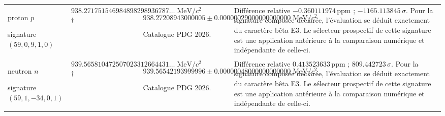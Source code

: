 \begin{longtable}{@{}>{\raggedright\arraybackslash}p{}>{\raggedright\arraybackslash}p{}>{\raggedright\arraybackslash}p{}>{\raggedright\arraybackslash}p{}@{}}
proton $p$\par signature $(59,\allowbreak 0,\allowbreak 9,\allowbreak 1,\allowbreak 0)$ & $938.271751\allowbreak{}546984\allowbreak{}898298\allowbreak{}936787\ldots\;\mathrm{MeV}/c^2$\textsuperscript{\(\dagger\)} & $938.272089\allowbreak{}430000\allowbreak{}05\pm 0.000000\allowbreak{}290000\allowbreak{}000000\allowbreak{}00\;\mathrm{MeV}/c^2$\par\footnotesize Catalogue PDG 2026. & Différence relative $-0.360111\allowbreak{}974\,\mathrm{ppm}$ ; $-1165.113845\,\sigma$. Pour la signature composée déclarée, l’évaluation se déduit exactement du caractère bêta E3. Le sélecteur prospectif de cette signature est une application antérieure à la comparaison numérique et indépendante de celle-ci. \\
neutron $n$\par signature $(59,\allowbreak 1,\allowbreak -34,\allowbreak 0,\allowbreak 1)$ & $939.565810\allowbreak{}472507\allowbreak{}023312\allowbreak{}664431\ldots\;\mathrm{MeV}/c^2$\textsuperscript{\(\dagger\)} & $939.565421\allowbreak{}939999\allowbreak{}96\pm 0.000000\allowbreak{}480000\allowbreak{}000000\allowbreak{}00\;\mathrm{MeV}/c^2$\par\footnotesize Catalogue PDG 2026. & Différence relative $0.413523\allowbreak{}633\,\mathrm{ppm}$ ; $809.442723\,\sigma$. Pour la signature composée déclarée, l’évaluation se déduit exactement du caractère bêta E3. Le sélecteur prospectif de cette signature est une application antérieure à la comparaison numérique et indépendante de celle-ci. \\
\end{longtable}
\endgroup
